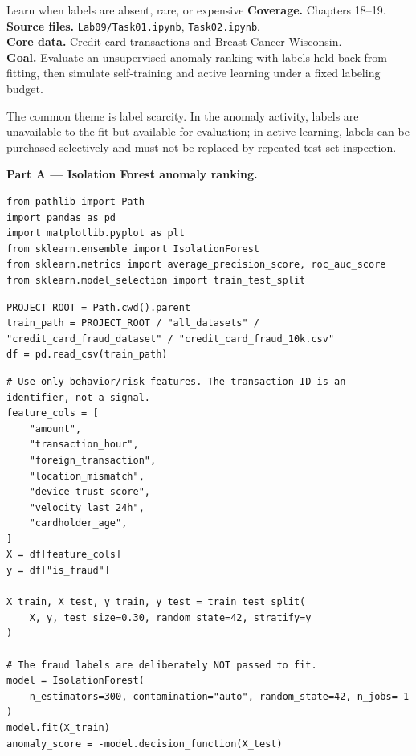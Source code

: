 
\begin{labproject}{Learn when labels are absent, rare, or expensive}
\textbf{Coverage.} Chapters 18--19.\\
\textbf{Source files.} \texttt{Lab09/Task01.ipynb}, \texttt{Task02.ipynb}.\\
\textbf{Core data.} Credit-card transactions and Breast Cancer Wisconsin.\\
\textbf{Goal.} Evaluate an unsupervised anomaly ranking with labels held back from fitting, then simulate self-training and active learning under a fixed labeling budget.

\begin{labmode}
The common theme is label scarcity. In the anomaly activity, labels are unavailable to the fit but available for evaluation; in active learning, labels can be purchased selectively and must not be replaced by repeated test-set inspection.
\end{labmode}

\medskip\noindent\textbf{Part A --- Isolation Forest anomaly ranking.}\par
\begin{lstlisting}[style=mlpython]
from pathlib import Path
import pandas as pd
import matplotlib.pyplot as plt
from sklearn.ensemble import IsolationForest
from sklearn.metrics import average_precision_score, roc_auc_score
from sklearn.model_selection import train_test_split
\end{lstlisting}

\begin{lstlisting}[style=mlpython]
PROJECT_ROOT = Path.cwd().parent
train_path = PROJECT_ROOT / "all_datasets" / "credit_card_fraud_dataset" / "credit_card_fraud_10k.csv"
df = pd.read_csv(train_path)
\end{lstlisting}

\begin{lstlisting}[style=mlpython]
# Use only behavior/risk features. The transaction ID is an identifier, not a signal.
feature_cols = [
    "amount",
    "transaction_hour",
    "foreign_transaction",
    "location_mismatch",
    "device_trust_score",
    "velocity_last_24h",
    "cardholder_age",
]
X = df[feature_cols]
y = df["is_fraud"]

X_train, X_test, y_train, y_test = train_test_split(
    X, y, test_size=0.30, random_state=42, stratify=y
)

# The fraud labels are deliberately NOT passed to fit.
model = IsolationForest(
    n_estimators=300, contamination="auto", random_state=42, n_jobs=-1
)
model.fit(X_train)
anomaly_score = -model.decision_function(X_test)


\end{lstlisting}
\end{labproject}

